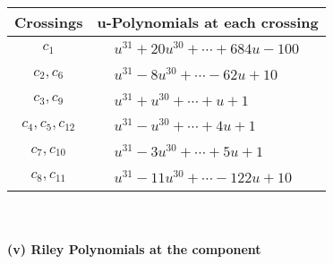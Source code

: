 \documentclass[1p]{elsarticle_modified}
\theoremstyle{definition}
\begin{document}
\begin{tabular}{m{50pt}|m{274pt}}
Crossings & \hspace{64pt}u-Polynomials at each crossing \\
\hline $$\begin{aligned}c_{1}\end{aligned}$$&$\begin{aligned}
&u^{31}+20 u^{30}+\cdots+684 u-100
\end{aligned}$\\
\hline $$\begin{aligned}c_{2},c_{6}\end{aligned}$$&$\begin{aligned}
&u^{31}-8 u^{30}+\cdots-62 u+10
\end{aligned}$\\
\hline $$\begin{aligned}c_{3},c_{9}\end{aligned}$$&$\begin{aligned}
&u^{31}+u^{30}+\cdots+u+1
\end{aligned}$\\
\hline $$\begin{aligned}c_{4},c_{5},c_{12}\end{aligned}$$&$\begin{aligned}
&u^{31}- u^{30}+\cdots+4 u+1
\end{aligned}$\\
\hline $$\begin{aligned}c_{7},c_{10}\end{aligned}$$&$\begin{aligned}
&u^{31}-3 u^{30}+\cdots+5 u+1
\end{aligned}$\\
\hline $$\begin{aligned}c_{8},c_{11}\end{aligned}$$&$\begin{aligned}
&u^{31}-11 u^{30}+\cdots-122 u+10
\end{aligned}$\\
\hline
\end{tabular}\\~\\
\newpage\renewcommand{\arraystretch}{1}
\flushleft \textbf{(v) Riley Polynomials at the component}\newline \\
\end{document}
